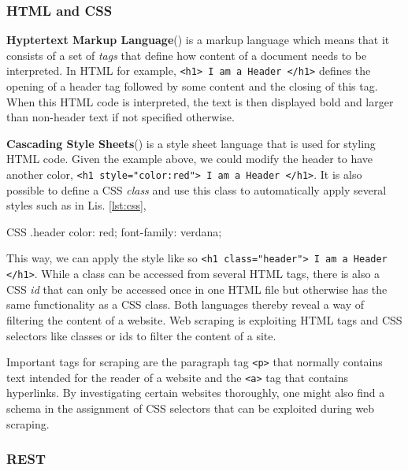 \subsubsection{HTML and CSS}
\textbf{Hyptertext Markup Language}() is a markup language which means that it consists of a set of \textsl{tags} that define how content of a document needs to be interpreted. In HTML for example, \texttt{<h1> I am a Header </h1>} defines the opening of a header tag followed by some content and the closing of this tag. When this HTML code is interpreted, the text is then displayed bold and larger than non-header text if not specified otherwise.

\textbf{Cascading Style Sheets}() is a style sheet language that is used for styling HTML code. Given the example above, we could modify the header to have another color, \texttt{<h1 style="color:red">  I am a Header </h1>}. It is also possible to define a CSS \emph{class} and use this class to automatically apply several styles such as in Lis. \ref{lst:css},\renewcommand{\figurename}{Listing}

\begin{listing}[h!]
  \centering
  \begin{cminted}{CSS}
    .header {
      color: red;
      font-family: verdana;
    }
  \end{cminted}
  \caption{CSS class named \emph{header} that sets the font to verdana and color to red when used.}
  \label{lst:css}
\end{listing}

This way, we can apply the style like so \texttt{<h1 class="header"> I am a Header </h1>}. While a class can be accessed from several HTML tags, there is also a CSS \emph{id} that can only be accessed once in one HTML file but otherwise has the same functionality as a CSS class.
Both languages thereby reveal a way of filtering the content of a website. Web scraping is exploiting HTML tags and CSS selectors like classes or ids to filter the content of a site.

Important tags for scraping are the paragraph tag \texttt{<p>} that normally contains text intended for the reader of a website and the \texttt{<a>} tag that contains hyperlinks. By investigating certain websites thoroughly, one might also find a schema in the assignment of CSS selectors that can be exploited during web scraping.

\subsubsection{REST}

